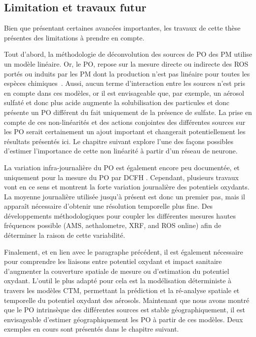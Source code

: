 \subsection{Limitation et travaux futur}%
\label{sub:limitation_et_travaux_futur}

Bien que présentant certaines avancées importantes, les travaux de cette thèse présentes
des limitations à prendre en compte.

Tout d'abord, la méthodologie de déconvolution des sources de PO des PM utilise un modèle
linéaire. Or, le PO, repose sur la mesure directe ou indirecte des ROS portés ou induits par les PM dont la production n'est pas linéaire pour toutes les espèces chimiques~\autocite{charrierDithiothreitol2012,sauvainComparison2013,charrierRates2015,charrierBias2016,calasImportance2017}.
Aussi, aucun
terme d'interaction entre les sources n'est pris en compte dans ces modèles, or il est
envisageable que, par exemple, un aérosol sulfaté et donc plus acide augmente la
solubilisation des particules  et donc présente un PO différent du fait uniquement de la
présence de sulfate.  La prise en compte de ces non-linéarités et des actions conjointes
des différentes sources sur les PO serait certainement un ajout important et changerait
potentiellement les résultats présentés ici. Le chapitre suivant explore l'une des façons
possibles d'estimer l'importance de cette non linéarité à partir d'un réseau de neurone.

La variation infra-journalière du PO est également encore peu documentée, et uniquement
pour la mesure du PO par DCFH \autocite{venkatachariMeasurement2005,costabileFirst2017}.
Cependant, plusieurs travaux vont en ce sens
\autocite{zhouDevelopment2018,jovanovicMeasurements2019} et montrent la forte variation
journalière des potentiels oxydants.  La moyenne journalière utilisée jusqu'à présent est
donc un premier pas, mais il apparaît nécessaire d'obtenir une résolution temporelle plus
fine.  Des développements méthodologiques pour coupler les différentes mesures hautes
fréquences possible (AMS, aethalometre, XRF, and ROS online) afin de déterminer la raison
de cette variabilité.

Finalement, et en lien avec le paragraphe précédent, il est également nécessaire pour
comprendre les liaisons entre potentiel oxydant et impact sanitaire d'augmenter la
couverture spatiale de mesure ou d'estimation du potentiel oxydant. L'outil le plus adapté pour cela est
la modélisation déterministe à travers les modèles CTM, permettant la prédiction et la
ré-analyse spatiale et temporelle du potentiel oxydant des aérosols. Maintenant que nous
avons montré que le PO intrinsèque des différentes sources est stable géographiquement,
il est envisageable d'estimer géographiquement les PO à partir de ces modèles. Deux
exemples en cours sont présentés dans le chapitre suivant.
